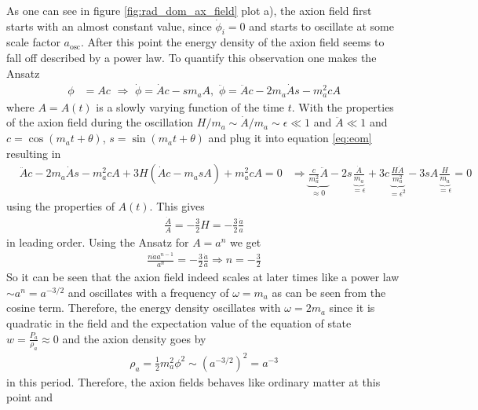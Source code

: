 \documentclass[a4paper, 12pt]{article}
\begin{document}
As one can see in figure \ref{fig:rad_dom_ax_field} plot a), the axion field first starts with an almost constant value, since $\dot{\phi}_i = 0$ and starts to oscillate
at some scale factor $a_\mathrm{osc}$. After this point the energy density of the axion field seems to fall off
described by a power law. To quantify this observation one makes the Ansatz \cite[Chap 4.3.1, Page 28]{MarshAxionCosmo}
\begin{align*}
    \phi &= A c \, \, \Rightarrow \,\,
    \dot{\phi} = \dot{A} c - s m_a A, \, \,
    \ddot{\phi} = \ddot{A} c - 2 m_a \dot{A} s - m_a^2 c A
\end{align*}
where $A = A(t)$ is a slowly varying function of the time $t$. With the properties of the axion field during the oscillation $H / m_a \sim \dot{A} / m_a \sim \epsilon \ll 1$ and $\ddot{A} \ll 1$
and $c = \cos(m_a t + \theta)$, $s = \sin(m_a t + \theta) $
and plug it into equation \ref{eq:eom}
resulting in
\begin{align*}
    &\ddot{A} c - 2 m_a \dot{A} s - m_a^2 c A + 3 H ( \dot{A} c - m_a s A) + m_a^2 c A = 0
    &\Rightarrow \underbrace{\frac{c}{m_a^2} \ddot{A}}_{\approx 0} - 2 s \underbrace{\frac{\dot{A}}{m_a}}_{= \epsilon} + 3c \underbrace{\frac{H \dot{A}}{m_a^2}}_{= \epsilon^2} - 3 s A \underbrace{\frac{H}{m_a}}_{= \epsilon} = 0
\end{align*}
using the properties of $A(t)$.
This gives
\begin{align*}
    \frac{\dot{A}}{A} = - \frac{3}{2} H = - \frac{3}{2} \frac{\dot{a}}{a}
\end{align*}
in leading order.
Using the Ansatz for $A = a^n$ we get
\begin{align*}
    \frac{n \dot{a} a^{n - 1}}{a^n} = - \frac{3}{2} \frac{\dot{a}}{a} \Rightarrow n = - \frac{3}{2}
\end{align*}
So it can be seen that the axion field indeed scales at later times like a power law $\sim a^n = a^{-3/2}$
and oscillates with a frequency of $\omega = m_a$ as can be seen from
the cosine term. Therefore, the energy density oscillates with $\omega = 2 m_a$
since it is quadratic in the field and
the expectation value of the equation of state $w = \frac{P_a}{\rho_a} \approx 0$ and the axion density goes by
\begin{align*}
    \rho_a = \frac{1}{2}m_a^2\phi^2 \sim \left(a^{-3/2}\right)^2 = a^{-3}
\end{align*}
in this period. Therefore, the axion fields behaves like ordinary matter at this point and
\end{document}
